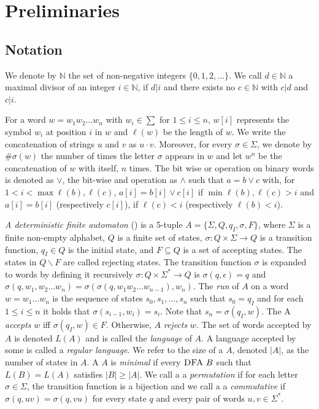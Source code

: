 \chapter{Preliminaries}
\label{ch:preliminaries}

\section{Notation}
\label{ch:prelimiaries:notation}
We denote by $\mathbb{N}$ the set of non-negative integers $\{0, 1, 2, \dots \}$.
We call $d \in \mathbb{N}$ a maximal divisor of an integer $i \in \mathbb{N}$, if $d|i$ and there exists no $c \in \mathbb{N}$ with $c|d$ and $c|i$.

For a word $w = w_1 w_2 \dots w_n$ with $w_i \in \sum$ for $1 \leq i \leq n$, $w[i]$ represents the symbol $w_i$ at position $i$ in $w$ and $\ell(w)$ be the length of $w$.
We write the concatenation of strings $u$ and $v$ as $u \cdot v$.
Moreover, for every $\sigma \in \Sigma$, we denote by $\#\sigma(w)$ the number of times the letter $\sigma$ appears in $w$ and let $w^n$ be the concatenation of $w$ with itself, $n$ times.
The bit wise or operation on binary words is denoted as $\lor$, the bit-wise and operation as $\land$ such that $a = b \vee c$ with, for $1 < i < \max{\ell(b), \ell(c)}$, $a[i] = b[i] \vee c[i]$ if $\min{\ell(b), \ell(c)} > i$ and  $a[i] = b[i]$ (respectively $c[i]$), if $\ell(c) < i$ (respectively $\ell(b) < i$).

\textit{A deterministic finite automaton} (\DFA) is a 5-tuple $A = \lbrace\Sigma, Q, q_I , \sigma, F\rbrace$, where $\Sigma$ is a finite non-empty alphabet, $Q$ is a finite set of states, $\sigma : Q \times \Sigma \rightarrow Q$ is a transition function, $q_I \in Q$ is the initial state, and $F \subseteq Q$ is a set of accepting states.
The states in $Q \backslash F$ are called rejecting states.
The transition function $\sigma$ is expanded to words by defining it recursively $\sigma : Q \times \Sigma^* \rightarrow Q$ is $\sigma(q, \epsilon) = q$ and $\sigma(q, w_1, w_2 \dots w_n ) = \sigma(\sigma(q, w_1 w_2 \dots w_{n-1} ), w_n )$.
The \textit{run} of $A$ on a word $w = w_1 \dots w_n$ is the sequence of states $s_0 , s_1 , \dots , s_n$ such that $s_0 = q_I$ and for each $1 \leq i \leq n$ it holds that $\sigma(s_{i-1} , w_i ) = s_i$.
Note that $s_n = \sigma(q_I , w)$. The \DFA A \textit{accepts} $w$ iff $\sigma(q_I , w) \in F$. Otherwise, $A$ \textit{rejects} $w$.
The set of words accepted by $A$ is denoted $L(A)$ and is called the \textit{language} of $A$.
A language accepted by some \DFA is called a \textit{regular language}.
We refer to the size of a \DFA $A$, denoted $|A|$, as the number of states in $A$.
A \DFA $A$ is \textit{minimal} if every $\textsc{DFA}~B$ such that $L(B) = L(A)$ satisfies $|B| \geq |A|$.
We call a \DFA a \textit{permutation \DFA} if for each letter $\sigma \in \Sigma$, the transition function is a bijection and we call a \DFA a \textit{commutative \DFA} if $\sigma(q, uv) = \sigma(q, vu)$ for every state $q$ and every pair of words $u, v \in \Sigma^*$.

